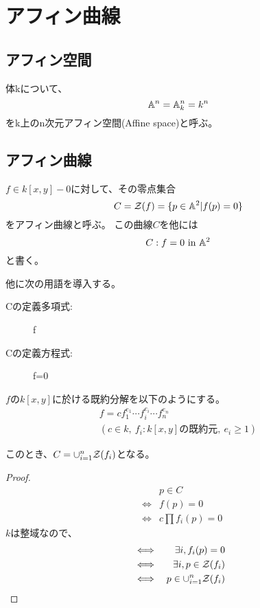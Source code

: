 \documentclass[a4paper]{jsarticle}
\begin{document}
\section{アフィン曲線}
    \subsection{アフィン空間}
    \begin{Def}
        体kについて、
        \[ \mathbb{A}^n=\mathbb{A}^n_{k}=k^n \]
        をk上のn次元アフィン空間(Affine space)と呼ぶ。
    \end{Def}

    \subsection{アフィン曲線}
    \begin{Def}
        $f \in k[x, y]-{0}$に対して、その零点集合
        \[ C=\mathcal{Z}(f)=\{ p \in \mathbb{A}^2 | f(p)=0 \} \]
        をアフィン曲線と呼ぶ。
        この曲線$C$を他には
        \[ C:f=0 ~\mbox{in}~ \mathbb{A}^2 \]
        と書く。
    \end{Def}

    他に次の用語を導入する。
    \begin{description}
        \item[Cの定義多項式:] f
        \item[Cの定義方程式:] f=0
    \end{description}

    $f$の$k[x,y]$に於ける既約分解を以下のようにする。
    \begin{gather*}
        f=cf_1^{e_1} \dotsm f_i^{e_i} \dotsm f_n^{e_n} \\
        (c \in k,~ f_i : k[x, y]\mbox{の既約元},~ e_i \geq 1)
    \end{gather*}

    このとき、$C=\cup_{i=1}^{n}{\mathcal{Z}(f_i)}$となる。

    \begin{proof}
    \begin{eqnarray*}
        &{}&    p \in C \\
        &\iff&  f(p) =0 \\
        &\iff&  c \prod{f_i(p)}=0
    \end{eqnarray*}
        $k$は整域なので、
    \begin{eqnarray*}
        &\iff& \exists i, f_i(p)=0 \\
        &\iff& \exists i, p \in \mathcal{Z}(f_i) \\
        &\iff& p \in \cup_{i=1}^{n}{\mathcal{Z}(f_i)}
    \end{eqnarray*}
    
    \end{proof}
\end{document}
